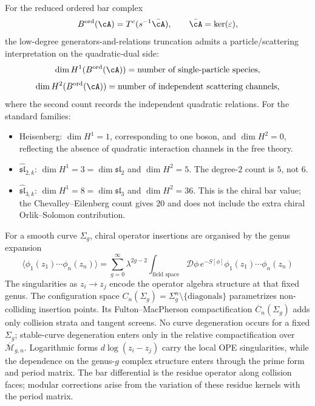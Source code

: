 \begin{remark}
\label{rem:v1-bar-cohomology-particle-scattering}
For the reduced ordered bar complex
\[
B^{\mathrm{ord}}(\cA) = T^c(s^{-1}\bar\cA),
\qquad
\bar\cA = \ker(\varepsilon),
\]
the low-degree generators-and-relations truncation admits a
particle/scattering interpretation on the quadratic-dual side:
\[
\dim H^1(B^{\mathrm{ord}}(\cA))
= \text{number of single-particle species},
\]
\[
\dim H^2(B^{\mathrm{ord}}(\cA))
= \text{number of independent scattering channels},
\]
where the second count records the independent quadratic relations.
For the standard families:
\begin{itemize}
\item Heisenberg: $\dim H^1 = 1$, corresponding to one boson, and
 $\dim H^2 = 0$, reflecting the absence of quadratic interaction
 channels in the free theory.
\item $\widehat{\mathfrak{sl}}_{2,k}$: $\dim H^1 = 3 = \dim \mathfrak{sl}_2$
 and $\dim H^2 = 5$. The degree-$2$ count is $5$, not $6$.
\item $\widehat{\mathfrak{sl}}_{3,k}$: $\dim H^1 = 8 = \dim \mathfrak{sl}_3$
 and $\dim H^2 = 36$. This is the chiral bar value; the
 Chevalley--Eilenberg count gives $20$ and does not include the
 extra chiral Orlik--Solomon contribution.
\end{itemize}
\end{remark}

\begin{remark}
For a smooth curve $\Sigma_g$, chiral operator insertions are organised by the
genus expansion
\[
\langle \phi_1(z_1) \cdots \phi_n(z_n) \rangle = \sum_{g=0}^{\infty} \lambda^{2g-2} \int_{\text{field space}} \mathcal{D}\phi \, e^{-S[\phi]} \phi_1(z_1) \cdots \phi_n(z_n)
\]
The singularities as $z_i \to z_j$ encode the operator algebra structure at
that fixed genus. The configuration space
$C_n(\Sigma_g) = \Sigma_g^n \setminus \{\text{diagonals}\}$ parametrizes
non-colliding insertion points. Its Fulton--MacPherson compactification
$\overline{C}_n(\Sigma_g)$ adds only collision strata and tangent screens.
No curve degeneration occurs for a fixed $\Sigma_g$; stable-curve
degeneration enters only in the relative compactification over
$\overline{\mathcal M}_{g,n}$. Logarithmic forms
$d\log(z_i-z_j)$ carry the local OPE singularities, while the dependence on
the genus-$g$ complex structure enters through the prime form and period
matrix. The bar differential is the residue operator along collision
faces; modular corrections arise from the variation of these residue kernels
with the period matrix.
\end{remark}

